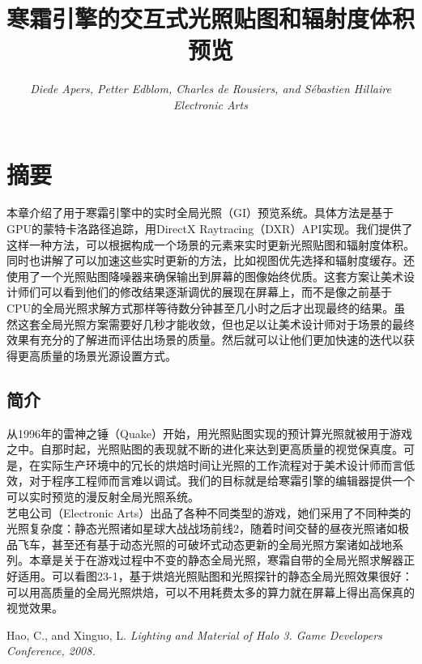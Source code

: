 \documentclass[12pt]{article}
\begin{document}
 
\title{\color{titcolor} 寒霜引擎的交互式光照贴图和辐射度体积预览}
\author{{\small\textsl{ Diede Apers, Petter Edblom, Charles de Rousiers, and Sébastien Hillaire}} \\ {\small\textsl{Electronic Arts}}}

\maketitle
\section{\color{titcolor} 摘要}
    本章介绍了用于寒霜引擎中的实时全局光照（GI）预览系统。具体方法是基于GPU的蒙特卡洛路径追踪，用DirectX Raytracing（DXR）API实现。我们提供了这样一种方法，可以根据构成一个场景的元素来实时更新光照贴图和辐射度体积。同时也讲解了可以加速这些实时更新的方法，比如视图优先选择和辐射度缓存。还使用了一个光照贴图降噪器来确保输出到屏幕的图像始终优质。这套方案让美术设计师们可以看到他们的修改结果逐渐调优的展现在屏幕上，而不是像之前基于CPU的全局光照求解方式那样等待数分钟甚至几小时之后才出现最终的结果。虽然这套全局光照方案需要好几秒才能收敛，但也足以让美术设计师对于场景的最终效果有充分的了解进而评估出场景的质量。然后就可以让他们更加快速的迭代以获得更高质量的场景光源设置方式。
    \subsection[23.1]{简介}
    从1996年的雷神之锤（Quake）开始，用光照贴图实现的预计算光照就被用于游戏之中。自那时起，光照贴图的表现就不断的进化来达到更高质量的视觉保真度\cite{halo}。可是，在实际生产环境中的冗长的烘焙时间让光照的工作流程对于美术设计师而言低效，对于程序工程师而言难以调试。我们的目标就是给寒霜引擎的编辑器提供一个可以实时预览的漫反射全局光照系统。 \\
    \indent 艺电公司（Electronic Arts）出品了各种不同类型的游戏，她们采用了不同种类的光照复杂度：静态光照诸如星球大战战场前线2，随着时间交替的昼夜光照诸如极品飞车，甚至还有基于动态光照的可破坏式动态更新的全局光照方案诸如战地系列。本章是关于在游戏过程中不变的静态全局光照，寒霜自带的全局光照求解器正好适用。可以看图23-1，基于烘焙光照贴图和光照探针的静态全局光照效果很好：可以用高质量的全局光照烘焙，可以不用耗费太多的算力就在屏幕上得出高保真的视觉效果。
\begin{thebibliography}{20}
Hao, C., and Xinguo, L.
\textit{Lighting and Material of Halo 3. Game Developers Conference, 2008.}
\end{thebibliography}
\end{document}

